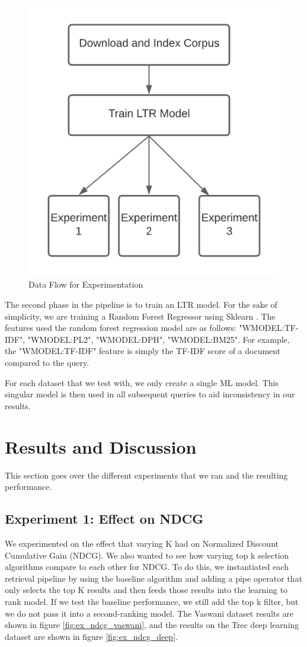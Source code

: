 \documentclass[letterpaper,12pt]{article}
\begin{document}
\begin{figure}[h!]
    \centering  %
    \includegraphics[width=.6\textwidth]{method.png} %
    \caption{Data Flow for Experimentation} %
    \label{fig:gen-pipeline} %
\end{figure}


The second phase in the pipeline is to train an LTR model. For the sake of simplicity, we are training a Random Forest Regressor using Sklearn \cite{scikit-learn}.
The features used the random forest regression model are as follows: "WMODEL:TF-IDF", "WMODEL:PL2", "WMODEL:DPH", "WMODEL:BM25".
For example, the "WMODEL:TF-IDF" feature is simply the TF-IDF score of a document compared to the query.

For each dataset that we test with, we only create a single ML model.
This singular model is then used in all subsequent queries to aid inconsistency in our results.

\section{Results and Discussion}

This section goes over the different experiments that we ran and the resulting performance.

\subsection{Experiment 1: Effect on NDCG}
\label{sec:ex1}

We experimented on the effect that varying K had on Normalized Discount Cumulative Gain (NDCG).
We also wanted to see how varying top k selection algorithms compare to each other for NDCG.
To do this, we instantiated each retrieval pipeline by using the baseline algorithm and adding a pipe operator that only selects the top K results and then feeds those results into the learning to rank model.
If we test the baseline performance, we still add the top k filter, but we do not pass it into a second-ranking model.
The Vaswani dataset results are shown in figure \ref{fig:ex_ndcg_vaswani}, and the results on the Trec deep learning dataset are shown in figure \ref{fig:ex_ndcg_deep}.
\end{document}
